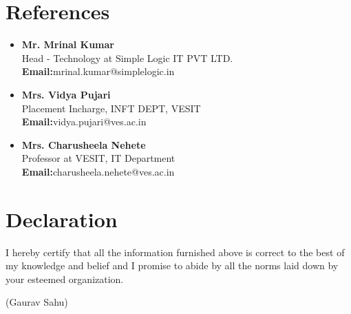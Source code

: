 \documentclass[11pt,a4paper]{moderncv}
\begin{document}

\section{References}

\begin{itemize}  	
	
   \item \textbf{Mr. Mrinal Kumar}\\
	Head - Technology at Simple Logic IT PVT LTD.\\
	\textbf{Email:}mrinal.kumar@simplelogic.in
	
	\item \textbf{Mrs. Vidya Pujari}\\
   	Placement Incharge, INFT DEPT, VESIT\\
	\textbf{Email:}vidya.pujari@ves.ac.in
	
	\item \textbf{Mrs. Charusheela Nehete}\\
	Professor at VESIT, IT Department\\
	\textbf{Email:}charusheela.nehete@ves.ac.in

\end{itemize}

\section{Declaration}
I hereby certify that all the information furnished above is correct to the best of my knowledge and belief and I promise to abide by all the norms laid down by your esteemed organization.

\vskip10mm\raggedleft
(Gaurav Sahu)
\end{document}
